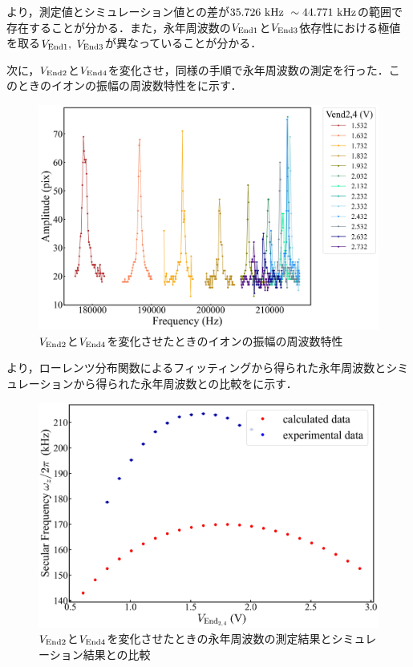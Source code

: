 より，測定値とシミュレーション値との差が$35.726 \ {\rm kHz} \ \sim 44.771 \ {\rm kHz}$の範囲で存在することが分かる．また，永年周波数の$V_{\rm End1}$と$V_{\rm End3}$依存性における極値を取る$V_{\rm End1}, \ V_{\rm End3}$が異なっていることが分かる．

次に，$V_{\rm End2}$と$V_{\rm End4}$を変化させ，同様の手順で永年周波数の測定を行った．このときのイオンの振幅の周波数特性をに示す．

\begin{figure}[h]
	\begin{center}
		\includegraphics[width = 0.6\linewidth]{./results/figure/end24-SecFreq.jpg}
		\caption{$V_{\rm End2}$と$V_{\rm End4}$を変化させたときのイオンの振幅の周波数特性}
		\label{fig:end24_MeasSec}
	\end{center}
\end{figure}

より，ローレンツ分布関数によるフィッティングから得られた永年周波数とシミュレーションから得られた永年周波数との比較をに示す．

\begin{figure}[h]
	\begin{center}
		\includegraphics[width = 0.6\linewidth]{./results/figure/Vend24-SecFreqZ.jpg}
		\caption{$V_{\rm End2}$と$V_{\rm End4}$を変化させたときの永年周波数の測定結果とシミュレーション結果との比較}
		\label{fig:end24_MeasSec_SimSec}
	\end{center}
\end{figure}

